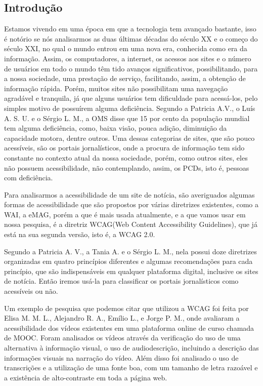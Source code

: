\documentclass[a4paper]{article}
\begin{document}
\begin{titlepage}
	\begin{center}
		\tableofcontents
	\end{center}
\end{titlepage}
\begin{titlepage}
\section{Introdução}
\fontsize{12pt}{0pt}\selectfont
Estamos vivendo em uma época em que a tecnologia tem avançado bastante, isso é notório se nós analisarmos as duas últimas décadas do século XX e o começo do século XXI, no qual o mundo entrou em uma nova era, conhecida como era da informação. Assim, os computadores, a internet, os acessos aos sites e o número de usuários em todo o mundo têm tido avanços significativos, possibilitando, para a nossa sociedade, uma prestação de serviço, facilitando, assim, a obtenção de informação rápida. Porém, muitos sites não possibilitam uma navegação agradável e tranquila, já que alguns usuários tem dificuldade para acessá-los, pelo simples motivo de possuírem alguma deficiência. Segundo a Patricia A.V., o Luís A. S. U. e o Sérgio L. M., a OMS disse que 15 por cento da população mundial tem alguma deficiência, como, baixa visão, pouca adição, diminuição da capacidade motora, dentre outros. Uma dessas categorias de sites, que são pouco acessíveis, são os portais jornalísticos, onde a procura de informação tem sido constante no contexto atual da nossa sociedade, porém, como outros sites, eles não possuem acessibilidade, não contemplando, assim, os PCDs, isto é, pessoas com deficiência.

Para analisarmos a acessibilidade de um site de notícia, são averiguados algumas formas de acessibilidade que são propostos por várias diretrizes existentes, como a WAI, a eMAG, porém a que é mais usada atualmente, e a que vamos usar em nossa pesquisa, é a diretriz WCAG(Web Content Accessibility Guidelines), que já está na sua segunda versão, isto é, a WCAG 2.0.

Segundo a Patricia A. V., a Tania A. e o Sérgio L. M., nela possui doze diretrizes organizadas em quatro princípios diferentes e algumas recomendações para cada princípio, que são indispensáveis em qualquer plataforma digital, inclusive os sites de notícia. Então iremos usá-la para classificar os portais jornalísticos como acessíveis ou não.

Um exemplo de pesquisa que podemos citar que utilizou a WCAG foi feita por Elisa M. M. L., Alejandro R. A., Emílio L., e Jorge P. M., onde avaliaram a acessibilidade dos vídeos existentes em uma plataforma online de curso chamada de MOOC. Foram analisados os vídeos através da verificação do uso de uma alternativa à informação visual, o uso de audiodescrição, incluindo a descrição das informações visuais na narração do vídeo. Além disso foi analisado o uso de transcrições e a utilização de uma fonte boa, com um tamanho de letra razoável e a existência de alto-contraste em toda a página web.


\end{titlepage}
\end{document}
